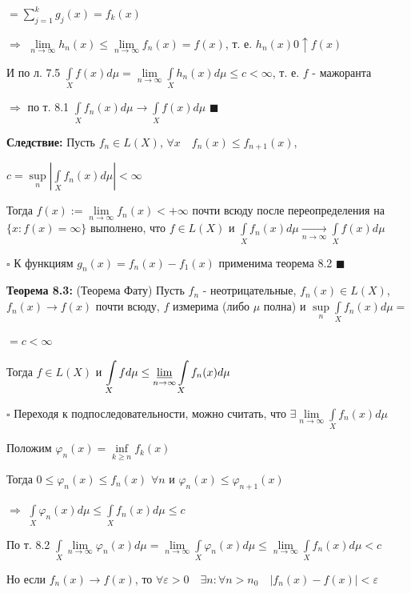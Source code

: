 \documentclass[a4paper]{report}
\begin{document}
\noindent $=\sum\limits_{j=1}^k g_j(x)=f_k(x)$

$\Rightarrow$ $\lim\limits_{n\to\infty} h_n(x)\le\lim\limits_{n\to\infty}f_n(x)=f(x)$, т. е. $h_n(x)0\uparrow f(x)$

И по л. 7.5 $\displaystyle\int\limits_X f(x)d\mu=\lim\limits_{n\to\infty}\displaystyle\int\limits_X h_n(x)d\mu\le c<\infty$, т. е. $f$ - мажоранта

$\Rightarrow$ по т. 8.1 $\displaystyle\int\limits_X f_n(x) d\mu\to\displaystyle\int\limits_X f(x)d\mu$ $\blacksquare$
\bigskip

\noindent\textbf{Следствие:} Пусть $f_n\in L(X)$, $\forall x\quad f_n(x)\le f_{n+1}(x)$,

$c=\sup\limits_n\left|\displaystyle\int\limits_X f_n(x)d\mu\right|<\infty$

Тогда $f(x):=\lim\limits_{n\to\infty} f_n(x)<+\infty$ почти всюду после переопределения на $\{x\colon f(x)=\infty\}$ выполнено, что $f\in L(X)$ и $\displaystyle\int\limits_X f_n(x)d\mu\xrightarrow[n\to\infty]{}\displaystyle\int\limits_X f(x)d\mu$

\noindent $\square$ К функциям $g_n(x)=f_n(x)-f_1(x)$ применима теорема 8.2 $\blacksquare$
\bigskip

\noindent\textbf{Теорема 8.3:} (Теорема Фату) Пусть $f_n$ - неотрицательные, $f_n(x)\in L(X)$, $f_n(x)\to f(x)$ почти всюду, $f$ измерима (либо $\mu$ полна) и $\sup\limits_n\displaystyle\int\limits_X f_n(x)d\mu=$

\noindent$=c<\infty$

Тогда $f\in L(X)$ и $\displaystyle\int\limits_X fd\mu\le\varliminf\limits_{n\to\infty}\displaystyle\int\limits_X f_n(x)d\mu$

\noindent $\square$ Переходя к подпоследовательности, можно считать, что $\exists\lim\limits_{n\to\infty}\displaystyle\int\limits_X f_n(x)d\mu$

Положим $\varphi_n(x)=\inf\limits_{k\ge n}f_k(x)$

 Тогда $0\le\varphi_n(x)\le f_n(x)$ $\forall n$ и $\varphi_n(x)\le\varphi_{n+1}(x)$

$\Rightarrow$ $\displaystyle\int\limits_X\varphi_n(x)d\mu\le\displaystyle\int\limits_X f_n(x)d\mu\le c$

По т. 8.2 $\displaystyle\int\limits_X\lim\limits_{n\to\infty}\varphi_n(x)d\mu=\lim\limits_{n\to\infty}\displaystyle\int\limits_X\varphi_n(x)d\mu\le\lim\limits_{n\to\infty}\displaystyle\int\limits_X
f_n(x)d\mu<c$

Но если $f_n(x)\to f(x)$, то $\forall\varepsilon>0\quad\exists n\colon\forall n>n_0\quad|f_n(x)-f(x)|<\varepsilon$
\end{document}
